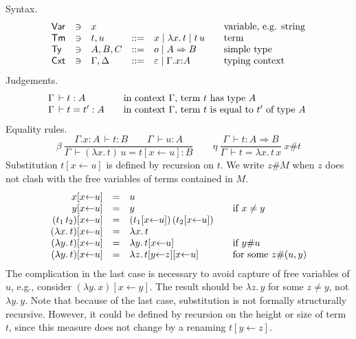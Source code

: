 \documentclass[a4paper,fleqn]{scrartcl}
\newcommand{\To}{\Rightarrow}
\newcommand{\der}{\,\vdash}
\newcommand{\subst}[3]{#3[#2{\leftarrow}#1]}
\newcommand{\substp}[3]{(#3)[#2{\leftarrow}#1]}
\newcommand{\ru}[2]{\dfrac{#1}{#2}}
\newcommand{\nru}[3]{#1\ \ru{#2}{#3}}
\newcommand{\nrux}[4]{\nru{#1}{#2}{#3}\ #4}
\newcommand{\Var}{\mathsf{Var}}
\newcommand{\Ty}{\mathsf{Ty}}
\newcommand{\Tm}{\mathsf{Tm}}
\newcommand{\Cxt}{\mathsf{Cxt}}
\begin{document}
Syntax.
\[
\begin{array}{lllrl@{\qquad}l}
\Var & \ni & x & & & \mbox{variable, e.g. string} \\
\Tm & \ni & t,u & ::= & x \mid \lambda x.\,t \mid t \, u & \mbox{term}
  \\
\Ty  & \ni & A,B,C & ::= & o \mid A \To B & \mbox{simple type} \\
\Cxt & \ni & \Gamma, \Delta & ::= & \varepsilon \mid \Gamma.x{:}A
  & \mbox{typing context}\\
\end{array}
\]
Judgements.
\[
\begin{array}{l@{\qquad}l}
  \Gamma \der t : A & \mbox{in context $\Gamma$, term $t$ has type $A$ } \\
  \Gamma \der t = t' : A & \mbox{in context $\Gamma$, term $t$ is equal to $t'$ of type $A$ } \\
\end{array}
\]
Equality rules.
\[
  \nru{\beta
    }{\Gamma.x{:}A \der t : B \qquad \Gamma \der u : A
    }{\Gamma \der (\lambda x.\,t)\,u = \subst u x t : B
    }
\qquad
  \nrux{\eta
   }{\Gamma \der t : A \To B
   }{\Gamma \der t = \lambda x.\,t\,x
   }{x\#t}
\]
Substitution $\subst u x t$ is defined by recursion on $t$.
We write $z\#M$ when $z$ does not clash with the free variables of
terms contained in $M$.
\[
\begin{array}{rll@{\qquad}l}
  \subst u x x & = & u \\
  \subst u x y & = & y & \mbox{if } x \not= y \\
  \subst u x {(t_1\,t_2)} & = & (\subst u x {t_1})\, (\subst u x {t_2}) \\
  \subst u x {(\lambda x.\,t)} & = & \lambda x.\,t \\
  \subst u x {(\lambda y.\,t)} & = & \lambda y.\,{\subst u x t}
    & \mbox{if } y\#u \\
  \subst u x {(\lambda y.\,t)} & = & \lambda z.\,{\subst u x {\subst z y t}}
    & \mbox{for some } z\#(u,y) \\
\end{array}
\]
The complication in the last case is necessary to avoid capture of
free variables of $u$, e.g., consider $\substp y x {\lambda y.\,x}$.
The result should be $\lambda z.\,y$ for some $z \not= y$, not
$\lambda y.\,y$.
Note that because of the last case, substitution is not formally
structurally recursive.  However, it could be defined by recursion on
the height or size of term $t$, since this measure does not change by
a renaming $\subst z y t$.
\end{document}
